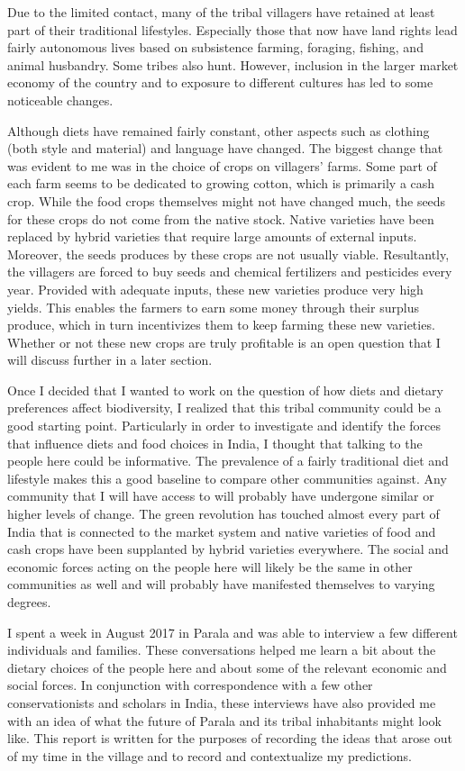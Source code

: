 \documentclass{article}
\begin{document}
Due to the limited contact, many of the tribal villagers have retained at least part of their traditional lifestyles. Especially those that now have land rights lead fairly autonomous lives based on subsistence farming, foraging, fishing, and animal husbandry. Some tribes also hunt. However, inclusion in the larger market economy of the country and to exposure to different cultures has led to some noticeable changes.

Although diets have remained fairly constant, other aspects such as clothing (both style and material) and language have changed. The biggest change that was evident to me was in the choice of crops on villagers' farms. Some part of each farm seems to be dedicated to growing cotton, which is primarily a cash crop. While the food crops themselves might not have changed much, the seeds for these crops do not come from the native stock. Native varieties have been replaced by hybrid varieties that require large amounts of external inputs. Moreover, the seeds produces by these crops are not usually viable. Resultantly, the villagers are forced to buy seeds and chemical fertilizers and pesticides every year. Provided with adequate inputs, these new varieties produce very high yields. This enables the farmers to earn some money through their surplus produce, which in turn incentivizes them to keep farming these new varieties. Whether or not these new crops are truly profitable is an open question that I will discuss further in a later section.

Once I decided that I wanted to work on the question of how diets and dietary preferences affect biodiversity, I realized that this tribal community could be a good starting point. Particularly in order to investigate and identify the forces that influence diets and food choices in India, I thought that talking to the people here could be informative. The prevalence of a fairly traditional diet and lifestyle makes this a good baseline to compare other communities against. Any community that I will have access to will probably have undergone similar or higher levels of change. The green revolution has touched almost every part of India that is connected to the market system and native varieties of food and cash crops have been supplanted by hybrid varieties everywhere. The social and economic forces acting on the people here will likely be the same in other communities as well and will probably have manifested themselves to varying degrees.

I spent a week in August 2017 in Parala and was able to interview a few different individuals and families. These conversations helped me learn a bit about the dietary choices of the people here and about some of the relevant economic and social forces. In conjunction with correspondence with a few other conservationists and scholars in India, these interviews have also provided me with an idea of what the future of Parala and its tribal inhabitants might look like. This report is written for the purposes of recording the ideas that arose out of my time in the village and to record and contextualize my predictions.
\end{document}
